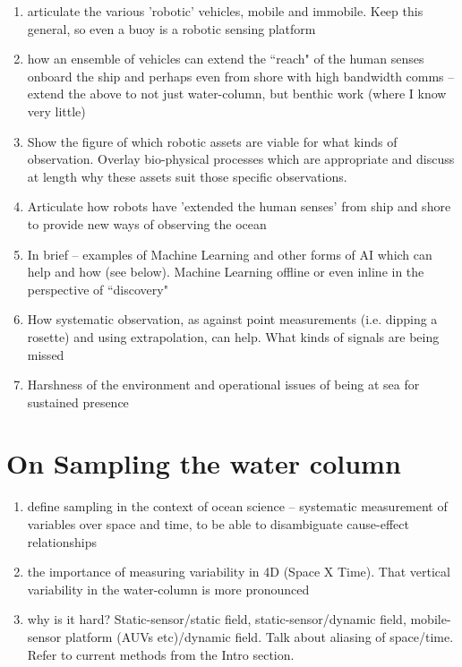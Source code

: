 \documentclass[12pt]{article}
\begin{document}
\begin{enumerate} 

  \item articulate the various 'robotic' vehicles, mobile and
    immobile. Keep this general, so even a buoy is a robotic sensing
    platform

  \item how an ensemble of vehicles can extend the “reach" of the
    human senses onboard the ship and perhaps even from shore with
    high bandwidth comms -- extend the above to not just water-column,
    but benthic work (where I know very little)

  \item Show the figure of which robotic assets are viable for what
    kinds of observation. Overlay bio-physical processes which are
    appropriate and discuss at length why these assets suit those
    specific observations.

  \item Articulate how robots have 'extended the human senses' from
    ship and shore to provide new ways of observing the ocean

  \item In brief -- examples of Machine Learning and other forms of AI
    which can help and how (see below). Machine Learning offline or
    even inline in the perspective of “discovery"

  \item How systematic observation, as against point measurements
    (i.e. dipping a rosette) and using extrapolation, can help. What
    kinds of signals are being missed

  \item Harshness of the environment and operational issues of being
    at sea for sustained presence

\end{enumerate}

  
\section{On Sampling the water column}

\begin{enumerate} 

\item define sampling in the context of ocean science -- systematic
  measurement of variables over space and time, to be able to
  disambiguate cause-effect relationships

\item the importance of measuring variability in 4D (Space X
  Time). That vertical variability in the water-column is more
  pronounced 
  
\item why is it hard? Static-sensor/static field,
  static-sensor/dynamic field, mobile-sensor platform (AUVs
  etc)/dynamic field. Talk about aliasing of space/time. Refer to
  current methods from the Intro section.

\end{enumerate}
\end{document}
